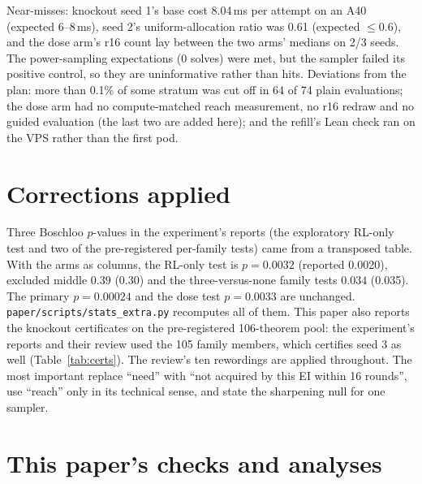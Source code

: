 Near-misses: knockout seed 1's base cost 8.04\,ms per attempt on an A40 (expected 6--8\,ms), seed 2's uniform-allocation
ratio was 0.61 (expected $\leq 0.6$), and the dose arm's r16 count lay between the two arms' medians on 2/3 seeds. The
power-sampling expectations (0 solves) were met, but the sampler failed its positive control, so they are uninformative
rather than hits. Deviations from the plan: more than 0.1\% of some stratum was cut off in 64 of 74 plain evaluations;
the dose arm had no compute-matched reach measurement, no r16 redraw and no guided evaluation (the last two are added
here); and the refill's Lean check ran on the VPS rather than the first pod.

\section{Corrections applied}
\label{app:corrections}
Three Boschloo $p$-values in the experiment's reports (the exploratory RL-only test and two of the pre-registered
per-family tests) came from a transposed table. With the arms as
columns, the RL-only test is $p = 0.0032$ (reported 0.0020), excluded middle $0.39$ (0.30) and the three-versus-none
family tests $0.034$ (0.035). The primary $p = 0.00024$ and the dose test $p = 0.0033$ are unchanged.
\texttt{paper/scripts/stats\_extra.py} recomputes all of them. This paper also reports the knockout certificates on the
pre-registered 106-theorem pool: the experiment's reports and their review used the 105 family members, which certifies
seed 3 as well (Table~\ref{tab:certs}). The review's ten rewordings are applied throughout. The most important replace
``need'' with ``not acquired by this EI within 16 rounds'', use ``reach'' only in its technical sense, and state the
sharpening null for one sampler.

\section{This paper's checks and analyses}
\label{sec:checks}


